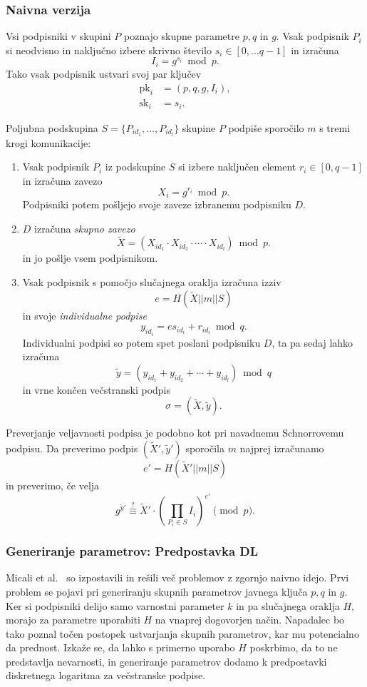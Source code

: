 \documentclass[isrm2, tisk]{fmfdelo}
\begin{document}
\subsubsection{Naivna verzija}
Vsi podpisniki v skupini $P$ poznajo skupne parametre $p, q$ in $g$. Vsak podpisnik $P_i$ si 
neodvisno in naključno izbere skrivno število $s_i \in [0, \dots q-1]$ in izračuna 
$$ 
I_i = g^{s_i} \bmod p.
$$
Tako vsak podpisnik ustvari svoj par ključev
\begin{align*}
    \text{pk}_i &= (p, q, g, I_i), \\
    \text{sk}_i &= s_i.
\end{align*}

Poljubna podskupina $S =\{P_{id_1}, \dots, P_{id_l}\}$ skupine $P$ podpiše sporočilo $m$ s tremi 
krogi komunikacije:
\begin{enumerate}
    \item Vsak podpisnik $P_i$ iz podskupine $S$ si izbere naključen element $r_i \in [0, q-1]$ 
        in izračuna zavezo 
        $$ 
        X_i = g^{r_i} \bmod p.
        $$
        Podpisniki potem pošljejo svoje zaveze izbranemu podpisniku $D$. 
    \item $D$ izračuna \textit{skupno zavezo} 
        $$ 
        \tilde{X} = (X_{id_1} \cdot X_{id_2} \cdot \cdots \cdot X_{id_l}) \bmod p.
        $$
        in jo pošlje vsem podpisnikom.
    \item Vsak podpisnik s pomočjo slučajnega oraklja izračuna izziv 
        $$ 
        e = H(\tilde{X} || m || S)
        $$
        in svoje \textit{individualne podpise} 
        $$ 
        y_{id_i} = e s_{id_i} + r_{id_i} \bmod q.
        $$
        Individualni podpisi so potem spet poslani podpisniku $D$, ta pa sedaj lahko 
        izračuna 
        $$ 
        \tilde{y} = (y_{id_1} + y_{id_2} + \cdots + y_{id_l}) \bmod q 
        $$
        in vrne končen večstranski podpis
        $$ 
        \sigma = (\tilde{X}, \tilde{y}).
        $$
\end{enumerate}

Preverjanje veljavnosti podpisa je podobno kot pri navadnemu Schnorrovemu podpisu. Da preverimo 
podpis $(\tilde{X}', \tilde{y}')$ sporočila $m$ najprej izračunamo 
$$ 
e' = H(\tilde{X}' || m || S)
$$ 
in preverimo, če velja 
$$
g^{\tilde{y}'} \stackrel{?}{\equiv} \tilde{X}' \cdot \left(\prod_{P_i \in S} I_i \right)^{e'} \pmod p.
$$

\subsubsection{Generiranje parametrov: Predpostavka DL}
Micali et al.~\cite{micali2001asm} so izpostavili in rešili več problemov z zgornjo naivno idejo. 
Prvi problem se pojavi pri generiranju skupnih parametrov javnega ključa $p, q$ in $g$. Ker si podpisniki 
delijo samo varnostni parameter $k$ in pa slučajnega oraklja $H$, morajo za parametre uporabiti 
$H$ na vnaprej dogovorjen način. Napadalec bo tako poznal točen postopek ustvarjanja skupnih 
parametrov, kar mu potencialno da prednost. Izkaže se, da lahko s primerno uporabo $H$ poskrbimo, 
da to ne predstavlja nevarnosti, in generiranje parametrov dodamo k predpostavki diskretnega 
logaritma za večstranske podpise. 
\end{document}
